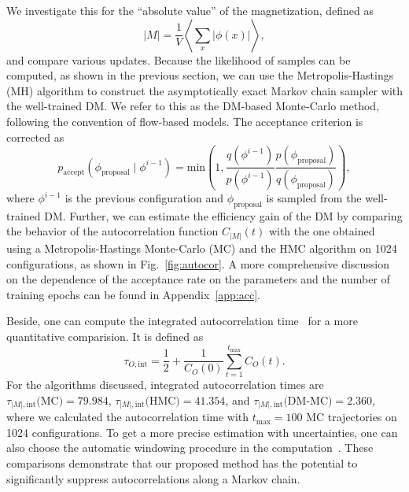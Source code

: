 {We investigate this for the ``absolute value'' of the magnetization, defined as 
\begin{equation}
|M| = \frac{1}{V} \left\langle  \sum_x \left|\phi(x) \right|\right\rangle,
\end{equation}
and compare various updates. Because the likelihood of samples can be computed, as shown in the previous section, we can use the Metropolis-Hastings (MH) algorithm to construct the asymptotically exact Markov chain sampler with the well-trained DM. We refer to this as the DM-based Monte-Carlo method, following the convention of flow-based models. The acceptance criterion is corrected as 
\begin{equation}
p_\text{accept}(\phi_\text{proposal}\mid \phi^{i-1}) = \text{min} \left ( 1, \frac{q(\phi^{i-1})}{p(\phi^{i-1})}\frac{p(\phi_\text{proposal})}{q(\phi_\text{proposal})} \right ),
\end{equation}
where $\phi^{i-1}$ is the previous configuration and $\phi_\text{proposal}$ is sampled from the well-trained DM. Further, we can estimate the efficiency gain of the DM by comparing the behavior of the autocorrelation function $C_{|M|}(t)$ with the one obtained using a Metropolis-Hastings Monte-Carlo (MC) and the HMC algorithm on 1024 configurations, as shown in Fig.~\ref{fig:autocor}. {A more comprehensive discussion on the dependence of the acceptance rate on the parameters and the number of training epochs can be found in Appendix~\ref{app:acc}}.

Beside, one can compute the integrated autocorrelation time~\cite{Schaefer:2010hu,Pawlowski:2018qxs,DelDebbio:2021qwf} for a more quantitative comparision. It is defined as
\begin{equation}
    \tau_{O,{\mathrm{int}}}={\frac{1}{2}}+{\frac{1}{C_{O}(0)}}\sum_{t=1}^{t_\text{max}}C_{O}(t).
\end{equation}
For the algorithms discussed, integrated autocorrelation times are $ \tau_{|M|,{\mathrm{int}}}\text{(MC)} = 79.984$, $\tau_{|M|,{\mathrm{int}}}\text{(HMC)} = 41.354$, and $\tau_{|M|,{\mathrm{int}}}\text{(DM-MC)} = 2.360$, where we calculated the autocorrelation time with $t_\text{max} = 100$ MC trajectories on 1024 configurations. To get a more precise estimation with uncertainties, one can also choose the automatic windowing procedure in the computation~\cite{Wolff:2003sm,Joswig:2022qfe}. These comparisons demonstrate that our proposed method has the potential to significantly suppress autocorrelations along a Markov chain.}

